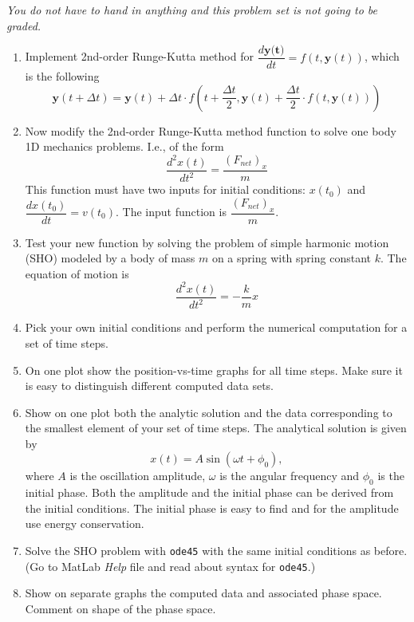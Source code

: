 \documentclass[letterpaper]{article}
\begin{document}
\emph{You do not have to hand in anything and this problem set is not going to be graded.} 
\begin{enumerate}
\item Implement 2nd-order Runge-Kutta method for $\dfrac{d \textbf{y(t)}}{dt}=f(t, \textbf{y}(t))$, which is the following
\begin{equation*}
\textbf{y}(t+\Delta t)=\textbf{y}(t)+\Delta t \cdot f \left(t+\dfrac{\Delta t}{2},\textbf{y}(t)+\dfrac{\Delta t}{2} \cdot f(t,\textbf{y}(t))\right)
\end{equation*}
\item Now modify the 2nd-order Runge-Kutta method function to solve one body 1D mechanics problems. I.e., of the form 
\begin{equation*}
\dfrac{d^2x(t)}{dt^2}=\dfrac{(F_{net})_{x}}{m}
\end{equation*}
This function must have two inputs for initial conditions: $x(t_0)$ and \mbox{$\dfrac{dx(t_0)}{dt}=v(t_0)$}. The input function is $\dfrac{(F_{net})_{x}}{m}$.
\item Test your new function by solving the problem of simple harmonic motion (SHO) modeled by a body of mass $m$ on a spring with spring constant $k$. The equation of motion is 
\begin{equation*}
\dfrac{d^2x(t)}{dt^2}=-\dfrac{k}{m}x
\end{equation*}
\item Pick your own initial conditions and perform the numerical computation for a set of time steps. 
\item On one plot show the position-vs-time graphs for all time steps. Make sure it is easy to distinguish different computed data sets. 
\item Show on one plot both the analytic solution and the data corresponding to the smallest element of your set of time steps. The analytical solution is given by
\begin{equation*}
x(t)=A \sin (\omega t+\phi_0),
\end{equation*}
where $A$ is the oscillation amplitude, $\omega$ is the angular frequency and $\phi_0$ is the initial phase. Both the amplitude and the initial phase can be derived from the initial conditions. The initial phase is easy to find and for the amplitude use energy conservation.
\item Solve the SHO problem with \verb|ode45| with the same initial conditions as before. (Go to MatLab \emph{Help} file and read about syntax for \verb|ode45|.)
\item Show on separate graphs the computed data and associated phase space. Comment on shape of the phase space.
\end{enumerate}
\end{document}
